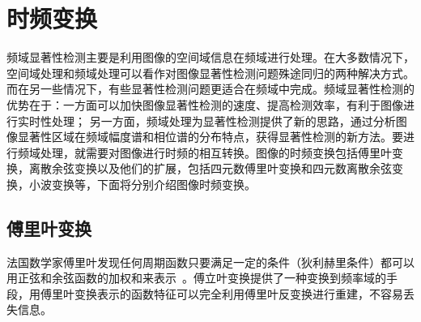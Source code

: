 \section{时频变换}
\label{2_2}

频域显著性检测主要是利用图像的空间域信息在频域进行处理。在大多数情况下，空间域处理和频域处理可以看作对图像显著性检测问题殊途同归的两种解决方式。而在另一些情况下，有些显著性检测问题更适合在频域中完成。频域显著性检测的优势在于：一方面可以加快图像显著性检测的速度、提高检测效率，有利于图像进行实时性处理； 另一方面，频域处理为显著性检测提供了新的思路，通过分析图像显著性区域在频域幅度谱和相位谱的分布特点，获得显著性检测的新方法。要进行频域处理，就需要对图像进行时频的相互转换。图像的时频变换包括傅里叶变换，离散余弦变换以及他们的扩展，包括四元数傅里叶变换和四元数离散余弦变换，小波变换等，下面将分别介绍图像时频变换。

\subsection{傅里叶变换}
\label{2_2_1}

法国数学家傅里叶发现任何周期函数只要满足一定的条件（狄利赫里条件）都可以用正弦和余弦函数的加权和来表示~\cite{ZhangZheng2010book}。傅立叶变换提供了一种变换到频率域的手段，用傅里叶变换表示的函数特征可以完全利用傅里叶反变换进行重建，不容易丢失信息。


